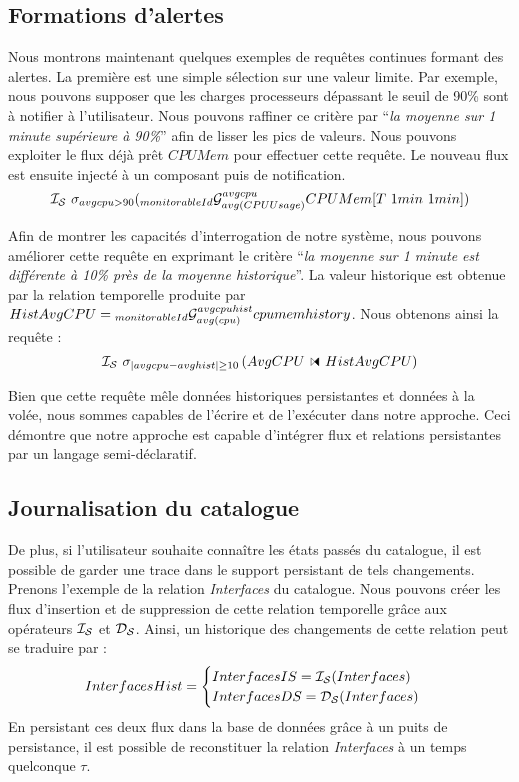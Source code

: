\subsection{Formations d'alertes}\label{sec:valid:domvision:requetes:alerte}
Nous montrons maintenant quelques exemples de requêtes continues formant des alertes. La première est une simple sélection sur une valeur limite. Par exemple, nous pouvons supposer que les charges processeurs dépassant le seuil de 90\% sont à notifier à l'utilisateur. Nous pouvons raffiner ce critère par \enquote{\it la moyenne sur 1 minute supérieure à 90\%} afin de lisser les pics de valeurs. Nous pouvons exploiter le flux déjà prêt $CPUMem$ pour effectuer cette requête. Le nouveau flux est ensuite injecté à un composant puis de notification.
$$\IS\ \sigma_{avgcpu>90}(\null_{monitorableId}\G_{avg(CPUUsage)}^{avgcpu} CPUMem[T\ 1min\ 1min])$$

Afin de montrer les capacités d'interrogation de notre système, nous pouvons améliorer cette requête en exprimant le critère \enquote{\it la moyenne sur 1 minute est différente à 10\% près de la moyenne historique}. La valeur historique est obtenue par la relation temporelle produite par $HistAvgCPU=\null_{monitorableId}\G_{avg(cpu)}^{avgcpuhist} cpumemhistory$. Nous obtenons ainsi la requête :
$$\IS\ \sigma_{\abs{avgcpu-avghist}\geq 10}\left(AvgCPU\ssjoin HistAvgCPU\right)$$

Bien que cette requête mêle données historiques persistantes et données à la volée, nous sommes capables de l'écrire et de l'exécuter dans notre approche. Ceci démontre que notre approche est capable d'intégrer flux et relations persistantes par un langage semi-déclaratif.

\subsection{Journalisation du catalogue}
De plus, si l'utilisateur souhaite connaître les états passés du catalogue, il est possible de garder une trace dans le support persistant de tels changements. Prenons l'exemple de la relation \textit{Interfaces} du catalogue. Nous pouvons créer les flux d'insertion et de suppression de cette relation temporelle grâce aux opérateurs $\mathcal{I_S}$ et $\mathcal{D_S}$. Ainsi, un historique des changements de cette relation peut se traduire par :
$$InterfacesHist = \begin{cases} InterfacesIS = \mathcal{I_S}(Interfaces) \\ InterfacesDS = \mathcal{D_S}(Interfaces)\end{cases}$$
En persistant ces deux flux dans la base de données grâce à un puits de persistance, il est possible de reconstituer la relation \textit{Interfaces} à un temps quelconque $\tau$.

